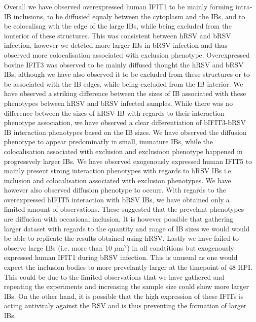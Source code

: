 Overall we have observed overexpressed human IFIT1 to be mainly forming intra-IB inclusions, to be diffusied equaly between the cytoplasm and the IBs, and to be colocalisng wth the edge of the large IBs, while being excluded from the ionterior of these structures. This was consistent between hRSV and bRSV infection, however we detcted more larger IBs in bRSV infection and thus observed more colocalisation associated with exclusion phenotype. Overexpressed bovine IFIT3 was observed to be mainly diffused thought the hRSV and bRSV IBs, although we have also observed it to be excluded from these structures or to be associated with the IB edges, while being excluded from the IB interior. We have observed a striking difference between the sizes of IB associated with these phenotypes between hRSV and bRSV infected samples. While there was no difference between the sizes of hRSV IB with regards to their interaction phenotype association, we have observed a clear differentiation of bIFIT3-bRSV IB interaction phenotypes based on the IB sizes. We have observed the diffusion phenotype to appear predominatly in small, immature IBs, while the colocalisation associated with exclusion and exclusioon phenotype happened in progressvely larger IBs. We have observed exogenously expressed human IFIT5 to mainly present strong interaction phenotypes with regards to hRSV IBs i.e. inclusion and colocalisation associated with exclusion phenotypes. We have however also observed diffusion phenotype to occurr. With regards to the overexpressed hIFIT5 interaction with bRSV IBs, we have obtained only a limited amount of observations. These suggested that the prevelant phenotypes are diffucion with occasional inclusion. It is however possible that gathering larger dataset with regards to the quantity and range of IB sizes we would would be able to replicate the results obtained using hRSV. Lastly we have failed to observe large IBs (i.e. more than 10 \(\mu \mbox{m}^2\)) in all condtitions but exogenously expressed human IFIT1 during bRSV infection. This is unusual as one would expect the inclusion bodies to more prevelantly larger at the timepoint of 48 HPI. This could be due to the limited observations that we have gathered and repeating the experiments and increasing the sample size could show more larger IBs. On the other hand, it is possible that the high expression of these IFITs is acting antiviraly against the RSV and is thus preventing the formation of larger IBs.